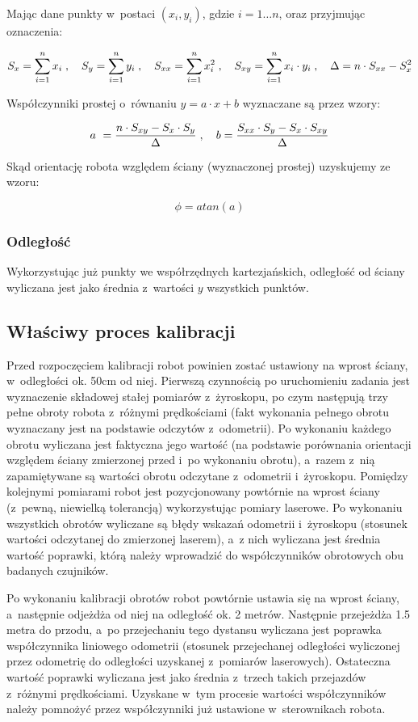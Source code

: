 Mając dane punkty w~postaci $(x_i, y_i)$, gdzie $i=1\ldots n$, oraz przyjmując
oznaczenia:

\[
S_x = \sum_{i=1}^n x_i \; , \quad
S_y = \sum_{i=1}^n y_i \; , \quad
S_{xx} = \sum_{i=1}^n x_i^2 \; , \quad
S_{xy} = \sum_{i=1}^n x_i \cdot y_i \; , \quad
\Delta = n \cdot S_{xx} - S_x^2
\]

Współczynniki prostej o~równaniu $y=a\cdot x+b$ wyznaczane są przez wzory:

\[
a~= \frac{n \cdot S_{xy} - S_x \cdot S_y}{\Delta} \; , \quad
b = \frac{S_{xx} \cdot S_y - S_x \cdot S_{xy}}{\Delta}
\]

Skąd orientację robota względem ściany (wyznaczonej prostej) uzyskujemy ze
wzoru:

\[
\phi=atan(a)
\]

\subsubsection{Odległość}

Wykorzystując już punkty we współrzędnych kartezjańskich, odległość od ściany
wyliczana jest jako średnia z~wartości $y$ wszystkich punktów.

\subsection{Właściwy proces kalibracji}

Przed rozpoczęciem kalibracji robot powinien zostać ustawiony na wprost ściany,
w~odległości ok. 50cm od niej. Pierwszą czynnością po uruchomieniu zadania jest
wyznaczenie składowej stałej pomiarów z~żyroskopu, po czym następują trzy
pełne obroty robota z~różnymi prędkościami (fakt wykonania pełnego obrotu
wyznaczany jest na podstawie odczytów z~odometrii). Po wykonaniu każdego obrotu
wyliczana jest faktyczna jego wartość (na podstawie porównania orientacji
względem ściany zmierzonej przed i~po wykonaniu obrotu), a~razem z~nią
zapamiętywane są wartości obrotu odczytane z~odometrii i~żyroskopu. Pomiędzy
kolejnymi pomiarami robot jest pozycjonowany powtórnie na wprost ściany 
(z~pewną, niewielką tolerancją) wykorzystując pomiary laserowe. Po wykonaniu
wszystkich obrotów wyliczane są błędy wskazań odometrii i~żyroskopu (stosunek
wartości odczytanej do zmierzonej laserem), a~z nich wyliczana jest średnia
wartość poprawki, którą należy wprowadzić do współczynników obrotowych obu
badanych czujników.

Po wykonaniu kalibracji obrotów robot powtórnie ustawia się na wprost ściany, 
a~następnie odjeżdża od niej na odległość ok. 2 metrów. Następnie przejeżdża 1.5
metra do przodu, a~po przejechaniu tego dystansu wyliczana jest poprawka
współczynnika liniowego odometrii (stosunek przejechanej odległości wyliczonej
przez odometrię do odległości uzyskanej z~pomiarów laserowych). Ostateczna
wartość poprawki wyliczana jest jako średnia z~trzech takich przejazdów 
z~różnymi prędkościami. Uzyskane w~tym procesie wartości współczynników należy
pomnożyć przez współczynniki już ustawione w~sterownikach robota.



